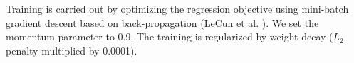\documentclass[10pt,twocolumn,letterpaper]{article}
\begin{document}
Training is carried out by optimizing the regression objective using mini-batch gradient descent based on back-propagation (LeCun et al. \cite{lecun1998gradient}). We set the momentum parameter to 0.9. The training is regularized by weight decay ($L_2$ penalty multiplied by
0.0001).  
%
%
%
%
%
%
%
%
%
%
\end{document}
